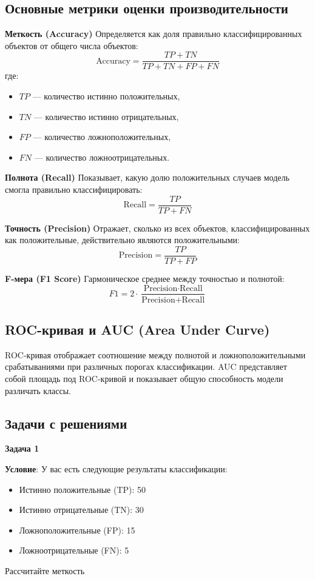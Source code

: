 \subsection{Основные метрики оценки производительности}

\textbf{Меткость (Accuracy)}
Определяется как доля правильно классифицированных объектов от общего числа объектов:
\[
\text{Accuracy} = \frac{TP + TN}{TP + TN + FP + FN}
\]
где:
\begin{itemize}
    \item \(TP\) — количество истинно положительных,
    \item \(TN\) — количество истинно отрицательных,
    \item \(FP\) — количество ложноположительных,
    \item \(FN\) — количество ложноотрицательных.
\end{itemize}

\textbf{Полнота (Recall)}
Показывает, какую долю положительных случаев модель смогла правильно классифицировать:
\[
\text{Recall} = \frac{TP}{TP + FN}
\]

\textbf{Точность (Precision)}
Отражает, сколько из всех объектов, классифицированных как положительные, действительно являются положительными:
\[
\text{Precision} = \frac{TP}{TP + FP}
\]

\textbf{F-мера (F1 Score)}
Гармоническое среднее между точностью и полнотой:
\[
F1 = 2 \cdot \frac{\text{Precision} \cdot \text{Recall}}{\text{Precision} + \text{Recall}}
\]

\subsection{ROC-кривая и AUC (Area Under Curve)}
ROC-кривая отображает соотношение между полнотой и ложноположительными срабатываниями при различных порогах классификации. AUC представляет собой площадь под ROC-кривой и показывает общую способность модели различать классы.

\subsection{Задачи с решениями}

\textbf{Задача 1}

\textbf{Условие}: У вас есть следующие результаты классификации:

\begin{itemize}
    \item Истинно положительные (TP): 50
    \item Истинно отрицательные (TN): 30
    \item Ложноположительные (FP): 15
    \item Ложноотрицательные (FN): 5
\end{itemize}
Рассчитайте меткость

